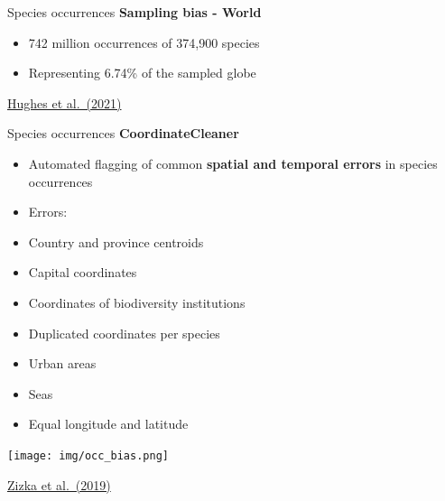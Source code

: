 \documentclass[
  ignorenonframetext,
]{beamer}
\providecommand{\tightlist}{%
  \setlength{\itemsep}{0pt}\setlength{\parskip}{0pt}}\usepackage{longtable,booktabs,array}
\begin{document}
\begin{frame}{Species occurrences}
\label{species-occurrences-6}
\textbf{Sampling bias - World}

\begin{itemize}
\tightlist
\item
  742 million occurrences of 374,900 species
\item
  Representing 6.74\% of the sampled globe
\end{itemize}

\href{https://doi.org/10.1111/ecog.05926}{Hughes et al.~(2021)}
\end{frame}

\begin{frame}{Species occurrences}
\label{species-occurrences-7}
\textbf{CoordinateCleaner}

\begin{itemize}
\tightlist
\item
  Automated flagging of common \textbf{spatial and temporal errors} in
  species occurrences
\item
  Errors:
\end{itemize}

\begin{itemize}
\tightlist
\item
  Country and province centroids
\item
  Capital coordinates
\item
  Coordinates of biodiversity institutions
\item
  Duplicated coordinates per species
\item
  Urban areas
\item
  Seas
\item
  Equal longitude and latitude
\end{itemize}

\texttt{[image: img/occ\_bias.png]}

\href{https://doi.org/10.1111/2041-210X.13152}{Zizka et al.~(2019)}
\end{frame}
\end{document}
